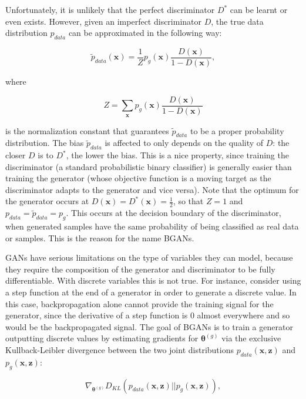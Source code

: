 Unfortunately, it is unlikely that the perfect discriminator $D^*$ can be learnt or even exists. However, given an imperfect discriminator $D$, the true data distribution $p_{data}$ can be approximated in the following way:

\begin{equation}
\label{eq:p_data_estimator}
\widetilde{p}_{data}(\bm{x}) = \frac{1}{Z} p_g(\bm{x}) \frac{D(\bm{x})}{1 - D(\bm{x})},
\end{equation}

where

\[
Z = \sum\limits_{\bm{x}} p_g(\bm{x}) \frac{D(\bm{x})}{1 - D(\bm{x})}
\]

is the normalization constant that guarantees $\widetilde{p}_{data}$ to be a proper probability distribution. The bias $\widetilde{p}_{data}$ is affected to only depends on the quality of $D$: the closer $D$ is to $D^*$, the lower the bias. This is a nice property, since training the discriminator (a standard probabilistic binary classifier) is generally easier than training the generator (whose objective function is a moving target as the discriminator adapts to the generator and vice versa). Note that the optimum for the generator occurs at $D(\bm{x}) = D^*(\bm{x}) = \frac{1}{2}$, so that $Z = 1$ and $p_{data} = \widetilde{p}_{data} = p_g$. This occurs at the decision boundary of the discriminator, when generated samples have the same probability of being classified as real data or samples. This is the reason for the name BGANs.

GANs have serious limitations on the type of variables they can model, because they require the composition of the generator and discriminator to be fully differentiable. With discrete variables this is not true. For instance, consider using a step function at the end of a generator in order to generate a discrete value. In this case, backpropagation alone cannot provide the training signal for the generator, since the derivative of a step function is $0$ almost everywhere and so would be the backpropagated signal. The goal of BGANs is to train a generator outputting discrete values by estimating gradients for $\bm{\theta}^{(g)}$ via the exclusive Kullback-Leibler divergence between the two joint distributions $p_{data}(\bm{x}, \bm{z})$ and $p_g(\bm{x}, \bm{z})$:

\begin{equation}
\nabla_{\bm{\theta}^{(g)}} D_{KL}(p_{data}(\bm{x}, \bm{z}) || p_g(\bm{x}, \bm{z})),
\end{equation}

